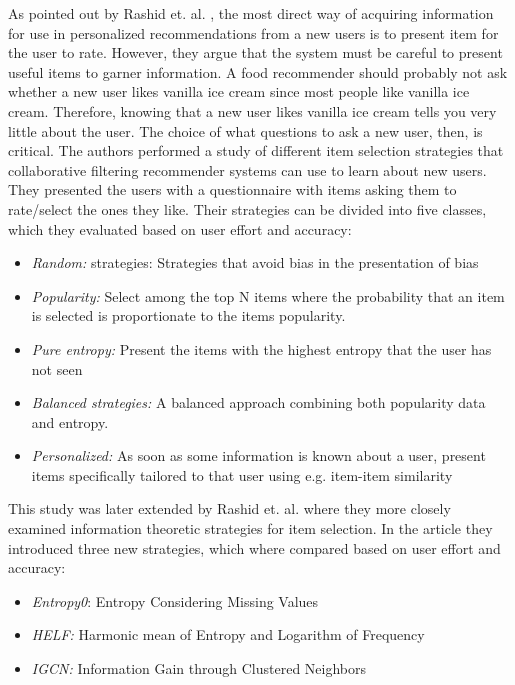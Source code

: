  
As pointed out by Rashid et. al. \cite{Rashid2002}, the most direct way of
acquiring information for use in personalized recommendations from a new users
is to present item for the user to rate. However, they argue that the system
must be careful to present useful items to garner information. A food
recommender should probably not ask whether a new user likes vanilla ice cream
since most people like vanilla ice cream. Therefore, knowing that a new user
likes vanilla ice cream tells you very little about the user. The choice of
what questions to ask a new user, then, is critical. The authors performed a
study of different item selection strategies that collaborative filtering
recommender systems can use to learn about new users. They presented the users
with a questionnaire with items asking them to rate/select the ones they like.
Their strategies can be divided into five classes, which they evaluated based on user effort and accuracy:

\begin{itemize}
\item \emph{Random:} strategies: Strategies that avoid bias in the presentation
of bias
\item \emph{Popularity:} Select among the top N items where the probability
that an item is selected is proportionate to the items popularity.
\item \emph{Pure entropy:} Present the items with the highest entropy that the
user has not seen
\item \emph{Balanced strategies:} A balanced approach combining both popularity
data and entropy.
\item \emph{Personalized:} As soon as some information is known about a user,
present items specifically tailored to that user using e.g. item-item
similarity
\end{itemize}



This study was later extended by Rashid et. al. \cite{Rashid2008} where they
more closely examined information theoretic strategies for item selection. In the article they introduced three new strategies, which where compared based on user effort and accuracy:

\begin{itemize}
\item \emph{Entropy0}: Entropy Considering Missing Values
\item \emph{HELF:} Harmonic mean of Entropy and Logarithm of Frequency
\item \emph{IGCN:} Information Gain through Clustered Neighbors
\end{itemize}

